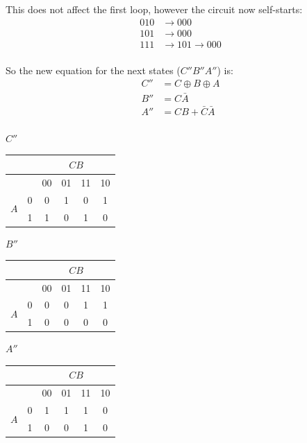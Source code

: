 \documentclass[10pt,\jkfside,a4paper]{article}
\begin{document}
\begin{enumerate}
This does not affect the first loop, however the circuit now self-starts:
\begin{equation}
\begin{split}
010 &\rightarrow 000\\
101 &\rightarrow 000\\
111 &\rightarrow 101 \rightarrow 000\\
\end{split}
\end{equation}

So the new equation for the next states ($C''B''A''$) is:
\begin{equation}
\begin{split}
C'' &= C\oplus B \oplus A\\
B'' &= C\bar A\\
A'' &= CB + \bar C\bar A\\
\end{split}
\end{equation}

\begin{center}

{\large $C''$}

\begin{tabular}{|c|c|c|c|c|c|} 
\hline
& & \multicolumn{4}{c|}{$CB$} \\
\hline
& & 00 & 01 & 11 & 10 \\ 
\hline
\multirow{2}{2em}{$A$} 
& 0 & 0 & 1 & 0 & 1 \\
& 1 & 1 & 0 & 1 & 0 \\
\hline
\end{tabular}

{\large $B''$}

\begin{tabular}{|c|c|c|c|c|c|} 
\hline
& & \multicolumn{4}{c|}{$CB$} \\
\hline
& & 00 & 01 & 11 & 10 \\ 
\hline
\multirow{2}{2em}{$A$} 
& 0 & 0 & 0 & 1 & 1 \\
& 1 & 0 & 0 & 0 & 0 \\
\hline
\end{tabular}

{\large $A''$}

\begin{tabular}{|c|c|c|c|c|c|} 
\hline
& & \multicolumn{4}{c|}{$CB$} \\
\hline
& & 00 & 01 & 11 & 10 \\ 
\hline
\multirow{2}{2em}{$A$} 
& 0 & 1 & 1 & 1 & 0 \\
& 1 & 0 & 0 & 1 & 0 \\
\hline
\end{tabular}


\end{center}
\end{enumerate}
\end{document}
